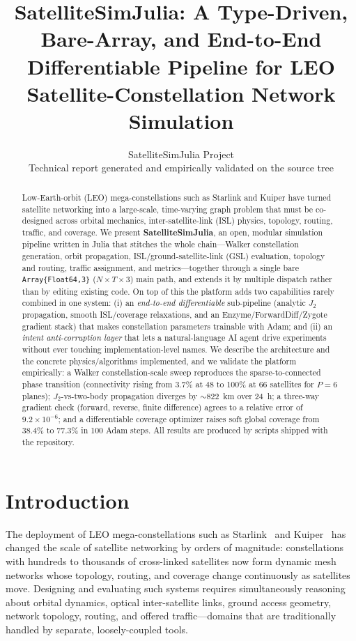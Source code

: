 \documentclass[10pt,twocolumn]{article}
\title{\textbf{SatelliteSimJulia: A Type-Driven, Bare-Array, and
End-to-End Differentiable Pipeline for LEO Satellite-Constellation
Network Simulation}}
\author{%
SatelliteSimJulia Project\\
\small Technical report generated and empirically validated on the source tree
}
\date{}
\newcommand{\code}[1]{\texttt{\small #1}}
\begin{document}
\maketitle

\begin{abstract}
Low-Earth-orbit (LEO) mega-constellations such as Starlink and Kuiper have
turned satellite networking into a large-scale, time-varying graph problem that
must be co-designed across orbital mechanics, inter-satellite-link (ISL)
physics, topology, routing, traffic, and coverage. We present
\textbf{SatelliteSimJulia}, an open, modular simulation pipeline written in
Julia that stitches the whole chain---Walker constellation generation, orbit
propagation, ISL/ground-satellite-link (GSL) evaluation, topology and routing,
traffic assignment, and metrics---together through a single bare
\code{Array\{Float64,3\}} ($N{\times}T{\times}3$) main path, and extends it by
multiple dispatch rather than by editing existing code. On top of this the
platform adds two capabilities rarely combined in one system: (i) an
\emph{end-to-end differentiable} sub-pipeline (analytic $J_2$ propagation,
smooth ISL/coverage relaxations, and an Enzyme/ForwardDiff/Zygote gradient
stack) that makes constellation parameters trainable with Adam; and (ii) an
\emph{intent anti-corruption layer} that lets a natural-language AI agent drive
experiments without ever touching implementation-level names. We describe the
architecture and the concrete physics/algorithms implemented, and we validate
the platform empirically: a Walker constellation-scale sweep reproduces the
sparse-to-connected phase transition (connectivity rising from 3.7\% at 48 to
100\% at 66 satellites for $P{=}6$ planes); $J_2$-vs-two-body propagation diverges by
$\sim\!822$~km over 24~h; a three-way gradient check (forward, reverse, finite
difference) agrees to a relative error of $9.2{\times}10^{-6}$; and a
differentiable coverage optimizer raises soft global coverage from 38.4\% to
77.3\% in 100 Adam steps. All results are produced by scripts shipped with the
repository.
\end{abstract}

\section{Introduction}
The deployment of LEO mega-constellations such as Starlink~\cite{starlink} and
Kuiper~\cite{kuiper} has changed the scale of satellite networking by orders of
magnitude: constellations with hundreds to thousands of cross-linked satellites
now form dynamic mesh networks whose topology, routing, and coverage change
continuously as satellites move. Designing and evaluating
such systems requires simultaneously reasoning about orbital dynamics, optical
inter-satellite links, ground access geometry, network topology, routing, and
offered traffic---domains that are traditionally handled by separate,
loosely-coupled tools.
\end{document}
